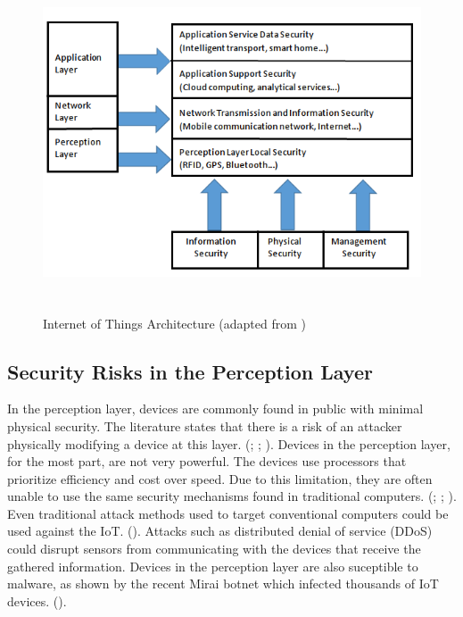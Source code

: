 \documentclass[letterpaper, 12pt]{article}
\begin{document}
\begin{flushleft}
\begin{figure}[H]
	\includegraphics[width=\linewidth,height=10cm,keepaspectratio]{figure2_new.png}
	\caption{Internet of Things Architecture (adapted from \cite{Zhao6746513})}
	\label{fig:arch}
\end{figure}

\subsection*{Security Risks in the Perception Layer}
In the perception layer, devices are commonly found in public with minimal physical security. The literature states that there is a risk of an attacker physically
modifying a device at this layer. (\cite{Zhao6746513}; \cite{Xiaohui6643029}; \cite{Suo6188257}). Devices in the perception layer, for the most part,
are not very powerful. The devices use processors that prioritize efficiency and cost over speed. Due to this limitation, they are often unable to use the same security mechanisms found in traditional computers. 
(\cite{Suo6188257}; \cite{Granjal7005393}; \cite{Xiaohui6643029}). Even traditional attack methods used to target conventional computers could be 
used against the IoT. (\cite{Zhao6746513}). Attacks such as distributed denial of service (DDoS) could disrupt sensors from communicating with the devices that receive the gathered information. Devices in the perception layer are also suceptible to malware, as shown by the recent Mirai
botnet which infected thousands of IoT devices. (\cite{Incapsula}). 


\end{flushleft}
\end{document}
